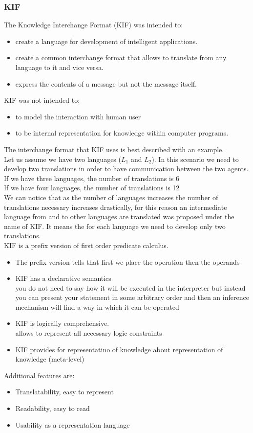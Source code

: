 \subsubsection{KIF}
The Knowledge Interchange Format (KIF) was intended to:
\begin{itemize}
\item  create a language for development of intelligent applications. 
\item create a common interchange format that allows to translate from any language to it and vice versa.
\item  express the contents of a message but not the message itself.
\end{itemize}
KIF was not intended to:
\begin{itemize}
\item to model the interaction with human user
\item to be internal representation for knowledge within computer programs.
\end{itemize}

The interchange format that KIF uses is best described with an example.\\
Let us assume we have two languages ($L_1$ and $L_2$). In this scenario we need to develop two translations in order to have communication between the two agents.\\
If we have three languages, the number of translations is 6\\
If we have four languages, the number of translations is 12\\

We can notice that as the number of languages increases the number of translations necessary increases drastically, for this reason an intermediate language from and to other languages are translated was proposed under the name of KIF.
It means the for each language we need to develop only two translations. \\

KIF is a prefix version of first order predicate calculus.
\begin{itemize}
\item The prefix version tells that first we place the operation then the operands 
\item KIF has a declarative semantics\\
you do not need to say how it will be executed in the interpreter but instead you can present your statement in some arbitrary order and then an inference mechanism will find a way in which it can be operated
\item KIF is logically comprehensive.\\
allows to represent all necessary logic constraints
\item KIF provides for representatino of knowledge about representation of knowledge (meta-level)
\end{itemize}
Additional features are:
\begin{itemize}
\item Translatability, easy to represent
\item Readability, easy to read
\item Usability as a representation language 
\end{itemize}

